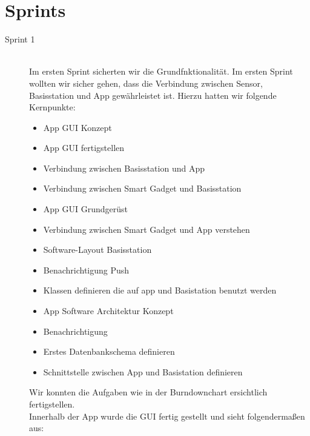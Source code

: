 \section{Sprints}
\begin{description}
	\item [Sprint 1] \hfill \\
	Im ersten Sprint sicherten wir die Grundfnktionalität. Im ersten Sprint wollten wir sicher gehen, dass die Verbindung zwischen Sensor, Basisstation und App gewährleistet ist. Hierzu hatten wir folgende Kernpunkte:
	\begin{itemize}		
		\item App GUI Konzept 
		\item App GUI fertigstellen
		\item Verbindung zwischen Basisstation und App
		\item Verbindung zwischen Smart Gadget und Basisstation
		\item App GUI Grundgerüst
		\item Verbindung zwischen Smart Gadget und App verstehen
		\item Software-Layout Basisstation
		\item Benachrichtigung Push
		\item Klassen definieren die auf app und Basistation benutzt werden
		\item App Software Architektur Konzept
		\item Benachrichtigung
		\item Erstes Datenbankschema definieren
		\item Schnittstelle zwischen App und Basistation definieren
	\end{itemize}
	Wir konnten die Aufgaben wie in der Burndownchart ersichtlich fertigstellen. \\
	\newpage
	Innerhalb der App wurde die GUI fertig gestellt und sieht folgendermaßen aus:


\end{description}
